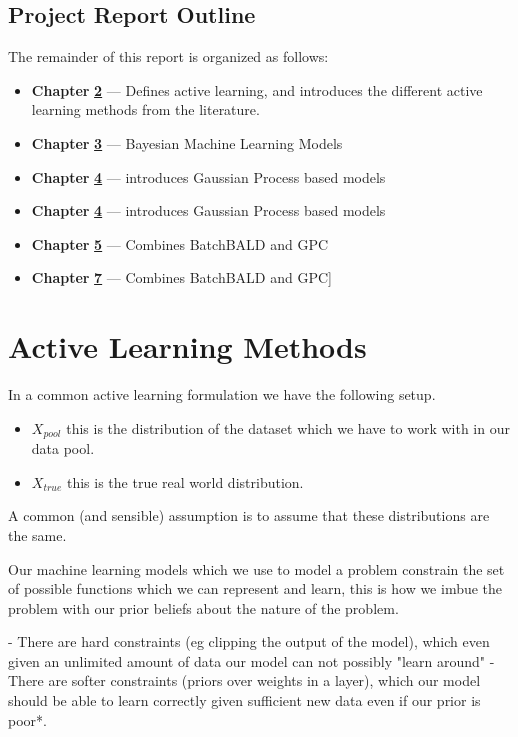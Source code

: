 \documentclass[12pt, a4paper]{report}
\theoremstyle{definition}
\theoremstyle{definition}
\theoremstyle{definition}
\begin{document}
\section{Project Report Outline}
The remainder of this report is organized as follows:
\begin{itemize}
    \item[] \textbf{Chapter} \hyperref[sec:ActiveLearning]{\textbf{2}} --- Defines active learning, and introduces the different active learning methods from the literature.
    \item[] \textbf{Chapter} \hyperref[sec:Models]{\textbf{3}} --- Bayesian Machine Learning Models
    \item[] \textbf{Chapter} \hyperref[sec:DUE]{\textbf{4}} --- introduces Gaussian Process based models
    \item[] \textbf{Chapter} \hyperref[sec:ActiveLearningWithDUE]{\textbf{4}} --- introduces Gaussian Process based models 
    \item[] \textbf{Chapter} \hyperref[sec:Implementation]{\textbf{5}} --- Combines BatchBALD and GPC
    \item[] \textbf{Chapter} \hyperref[sec:Experiments]{\textbf{7}} --- Combines BatchBALD and GPC] 
\end{itemize}


\chapter{Active Learning Methods}
\label{sec:ActiveLearning}

In a common active learning formulation we have the following setup.

\begin{itemize}
    \item $X_{pool}$ this is the distribution of the dataset which we have to work with in our data pool.
    \item $X_{true}$ this is the true real world distribution.
\end{itemize}

A common (and sensible) assumption is to assume that these distributions are the same.

Our machine learning models which we use to model a problem constrain the set of possible functions which we can represent and learn, this is how we imbue the problem with our prior beliefs about the nature of the problem.

- There are hard constraints (eg clipping the output of the model), which even given an unlimited amount of data our model can not possibly "learn around"
- There are softer constraints (priors over weights in a layer), which our model should be able to learn correctly given sufficient new data even if our prior is poor*.
\end{document}
